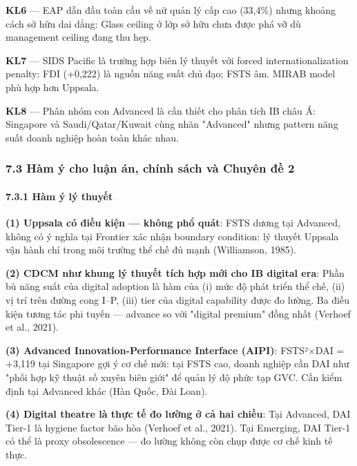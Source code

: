 \documentclass[12pt,a4paper]{article}
\begin{document}
\textbf{KL6} --- EAP dẫn đầu toàn cầu về nữ quản lý cấp cao (33,4\%)
nhưng khoảng cách sở hữu dai dẳng: Glass ceiling ở lớp sở hữu chưa được
phá vỡ dù management ceiling đang thu hẹp.

\textbf{KL7} --- SIDS Pacific là trường hợp biên lý thuyết với forced
internationalization penalty: FDI (+0,222) là nguồn năng suất chủ đạo;
FSTS âm. MIRAB model phù hợp hơn Uppsala.

\textbf{KL8} --- Phân nhóm con Advanced là cần thiết cho phân tích IB
châu Á: Singapore và Saudi/Qatar/Kuwait cùng nhãn "Advanced" nhưng
pattern năng suất doanh nghiệp hoàn toàn khác nhau.

\hypertarget{73-huxe0m-uxfd-cho-luux1eadn-uxe1n-chuxednh-suxe1ch-vuxe0-chuyuxean-ux111ux1ec1-2}{%
\subsubsection{7.3 Hàm ý cho luận án, chính sách và Chuyên đề
2}\label{73-huxe0m-uxfd-cho-luux1eadn-uxe1n-chuxednh-suxe1ch-vuxe0-chuyuxean-ux111ux1ec1-2}}

\hypertarget{731-huxe0m-uxfd-luxfd-thuyux1ebft}{%
\paragraph{7.3.1 Hàm ý lý
thuyết}\label{731-huxe0m-uxfd-luxfd-thuyux1ebft}}

\textbf{(1) Uppsala có điều kiện --- không phổ quát}: FSTS dương tại
Advanced, không có ý nghĩa tại Frontier xác nhận boundary condition: lý
thuyết Uppsala vận hành chỉ trong môi trường thể chế đủ mạnh
(Williamson, 1985).

\textbf{(2) CDCM như khung lý thuyết tích hợp mới cho IB digital era}:
Phần bù năng suất của digital adoption là hàm của (i) mức độ phát triển
thể chế, (ii) vị trí trên đường cong I--P, (iii) tier của digital
capability được đo lường. Ba điều kiện tương tác phi tuyến --- advance
so với "digital premium" đồng nhất (Verhoef et al., 2021).

\textbf{(3) Advanced Innovation-Performance Interface (AIPI)}: FSTS²×DAI
= +3,119 tại Singapore gợi ý cơ chế mới: tại FSTS cao, doanh nghiệp cần
DAI như "phối hợp kỹ thuật số xuyên biên giới" để quản lý độ phức tạp
GVC. Cần kiểm định tại Advanced khác (Hàn Quốc, Đài Loan).

\textbf{(4) Digital theatre là thực tế đo lường ở cả hai chiều}: Tại
Advanced, DAI Tier-1 là hygiene factor bão hòa (Verhoef et al., 2021).
Tại Emerging, DAI Tier-1 có thể là proxy obsolescence --- đo lường không
còn chụp được cơ chế kinh tế thực.
\end{document}

